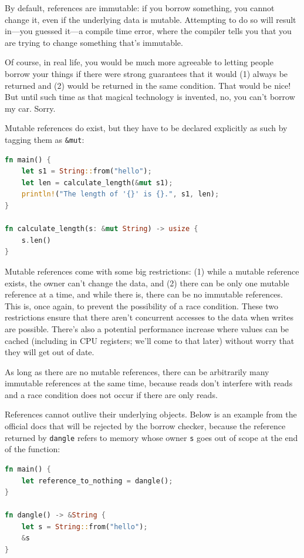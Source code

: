 \documentclass[a4paper]{report}
\begin{document}
By default, references are immutable: if you borrow something, you cannot change it, even if the underlying data is mutable. Attempting to do so will result in---you guessed it---a compile time error, where the compiler tells you that you are trying to change something that's immutable. 

Of course, in real life, you would be much more agreeable to letting people borrow your things if there were strong guarantees that it would (1) always be returned and (2) would be returned in the same condition. That would be nice! But until such time as that magical technology is invented, no, you can't borrow my car. Sorry.

Mutable references do exist, but they have to be declared explicitly as such by tagging them as \texttt{\&mut}:

\begin{lstlisting}[language=Rust]
fn main() {
    let s1 = String::from("hello");
    let len = calculate_length(&mut s1);
    println!("The length of '{}' is {}.", s1, len);
}

fn calculate_length(s: &mut String) -> usize {
    s.len()
}
\end{lstlisting}

Mutable references come with  some big restrictions: (1) while a mutable reference exists, the owner can't change the data, and (2) there can be only one mutable reference at a time, and while there is, there can be no immutable references. This is, once again, to prevent the possibility of a race condition. These two restrictions ensure that there aren't concurrent accesses to the data when writes are possible. There's also a potential performance increase where values can be cached (including in CPU registers; we'll come to that later) without worry that they will get out of date.

As long as there are no mutable references, there can be arbitrarily many immutable references at the same time, because reads don't interfere with reads and a race condition does not occur if there are only reads. 

References cannot outlive their underlying objects. Below is an example from the official docs that will be rejected by the borrow checker, because the reference returned by \texttt{dangle} refers to memory whose owner \texttt{s} goes out of scope at the end of the function:

\begin{lstlisting}[language=Rust]
fn main() {
    let reference_to_nothing = dangle();
}

fn dangle() -> &String {
    let s = String::from("hello");
    &s
}
\end{lstlisting} 
\end{document}
